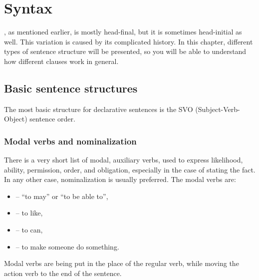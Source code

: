 \chapter{Syntax}
\label{ch:syntax}

\andro, as mentioned earlier, is mostly head-final, but it is sometimes
head-initial as well. This variation is caused by its complicated history. In
this chapter, different types of sentence structure will be presented, so you
will be able to understand how different clauses work in general.

\section{Basic sentence structures}
\label{sec:basic}

The most basic structure for declarative sentences is the SVO
(Subject-Verb-Object) sentence order.


\subsection{Modal verbs and nominalization}

There is a very short list of modal, auxiliary verbs, used to express
likelihood, ability, permission, order, and obligation, especially in the case
of stating the fact. In any other case, nominalization is usually preferred. The
modal verbs are:

\begin{itemize}
    \item {} -- ``to may'' or ``to be able to'',
    \item {} -- to like,
    \item {} -- to can,
    \item {} -- to make someone do something.
\end{itemize}



Modal verbs are being put in the place of the regular verb, while moving the
action verb to the end of the sentence.


